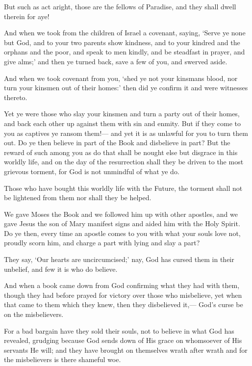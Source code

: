 \documentclass[fontsize=14pt, letterpaper, notitlepage, openany, DIV=12]{scrbook} %
\begin{document}
\noindent[2:82]
But such as act aright, those are the fellows of Paradise, and they shall dwell therein for
aye!

\noindent[2:83]
And when we took from the children of Israel a covenant, saying, `Serve ye none but
God, and to your two parents show kindness, and to your kindred and the orphans and the poor,
and speak to men kindly, and be steadfast in prayer, and give alms;' and then ye turned back,
save a few of you, and swerved aside.

\noindent[2:84]
And when we took covenant from you, `shed ye not your kinsmans blood, nor turn your
kinsmen out of their homes:' then did ye confirm it and were witnesses thereto.

\noindent[2:85]
Yet ye were those who slay your kinsmen and turn a party out of their homes, and back
each other up against them with sin and enmity. But if they come to you as captives ye ransom
them!--- and yet it is as unlawful for you to turn them out. Do ye then believe in part of the Book
and disbelieve in part? But the reward of such among you as do that shall be nought else but
disgrace in this worldly life, and on the day of the resurrection shall they be driven to the most
grievous torment, for God is not unmindful of what ye do.

\noindent[2:86]
Those who have bought this worldly life with the Future, the torment shall not be
lightened from them nor shall they be helped.

\noindent[2:87]
We gave Moses the Book and we followed him up with other apostles, and we gave Jesus
the son of Mary manifest signs and aided him with the Holy Spirit. Do ye then, every time an
apostle comes to you with what your souls love not, proudly scorn him, and charge a part with
lying and slay a part?

\noindent[2:88]
They say, `Our hearts are uncircumcised;' nay, God has cursed them in their unbelief,
and few it is who do believe.

\noindent[2:89]
And when a book came down from God confirming what they had with them, though
they had before prayed for victory over those who misbelieve, yet when that came to them which
they knew, then they disbelieved it,--- God's curse be on the misbelievers.

\noindent[2:90]
For a bad bargain have they sold their souls, not to believe in what God has revealed,
grudging because God sends down of His grace on whomsoever of His servants He will; and
they have brought on themselves wrath after wrath and for the misbelievers is there shameful
woe.
\end{document}
